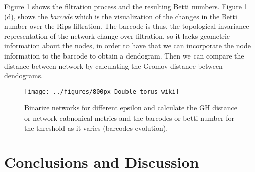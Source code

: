 \documentclass[onecollarge,runningheads]{svjour2}
\begin{document}
Figure \ref{fig:ph1} shows the filtration process and the resulting Betti numbers. Figure \ref{fig:ph1} (d), shows the  \textit{barcode} which is the visualization of the changes in the Betti number over the Rips filtration. The barcode is thus, the topological invariance representation of the network change over filtration, so it lacks geometric information about the nodes, in order to have that we can incorporate the node information to the barcode to obtain a dendogram. Then we can compare the distance between network by calculating the Gromov distance between dendograms.
\begin{figure}[h]
        \centering
        \texttt{[image: ../figures/800px-Double\_torus\_wiki]}
        \caption{Binarize networks for different epsilon and calculate the GH distance or network cabnonical metrics and the barcodes or betti number for the threshold as it varies (barcodes evolution).
}
\label{fig:ph1}
\end{figure}


\section{Conclusions and Discussion}
\label{se:conclusion}
\end{document}
